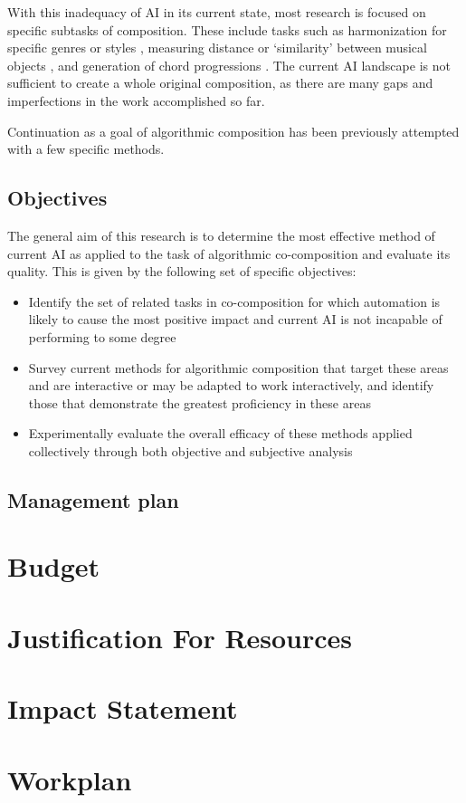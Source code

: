 \documentclass[11pt]{article}
\begin{document}
	With this inadequacy of AI in its current state, most research is focused on specific subtasks of composition. These include tasks such as harmonization for specific genres or styles \cite[]{mcintyre1994bach}, measuring distance or `similarity' between musical objects \cite[]{horner1991genetic}, and generation of chord progressions \cite[]{chemillier2004toward}. The current AI landscape is not sufficient to create a whole original composition, as there are many gaps and imperfections in the work accomplished so far. 
	
	Continuation as a goal of algorithmic composition has been previously attempted with a few specific methods. 
	
	\subsection{Objectives}
	
	The general aim of this research is to determine the most effective method of current AI as applied to the task of algorithmic co-composition and evaluate its quality. This is given by the following set of specific objectives:
	 
	\begin{itemize}
		\item Identify the set of related tasks in co-composition for which automation is likely to cause the most positive impact and current AI is not incapable of performing to some degree
		\item Survey current methods for algorithmic composition that target these areas and are interactive or may be adapted to work interactively, and identify those that demonstrate the greatest proficiency in these areas
		\item Experimentally evaluate the overall efficacy of these methods applied collectively through both objective and subjective analysis
	\end{itemize}
	
	\subsection{Management plan}
	
	\section{Budget}
	
	\section{Justification For Resources}
	
	\section{Impact Statement}
	
	\section{Workplan}
	
	\printbibliography
	
\end{document}
